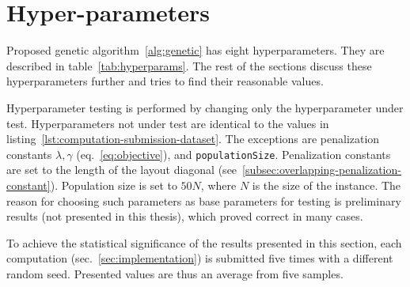 \newpage


\section{Hyper-parameters}\label{sec:hyper-parameters}

Proposed genetic algorithm~\ref{alg:genetic} has eight hyperparameters.
They are described in table~\ref{tab:hyperparams}.
The rest of the sections discuss these hyperparameters further and tries to find their reasonable values.

Hyperparameter testing is performed by changing only the hyperparameter under test.
Hyperparameters not under test are identical to the values in listing~\ref{lst:computation-submission-dataset}.
The exceptions are penalization constants $\lambda, \gamma$ (eq.~\ref{eq:objective}), and \verb|populationSize|.
Penalization constants are set to the length of the layout diagonal (see~\ref{subsec:overlapping-penalization-constant}).
Population size is set to $50N$, where $N$ is the size of the instance.
The reason for choosing such parameters as base parameters for testing
is preliminary results (not presented in this thesis), which proved correct in many cases.

To achieve the statistical significance of the results presented in this section, each computation (sec.~\ref{sec:implementation}) is submitted five times with a different random seed.
Presented values are thus an average from five samples.


